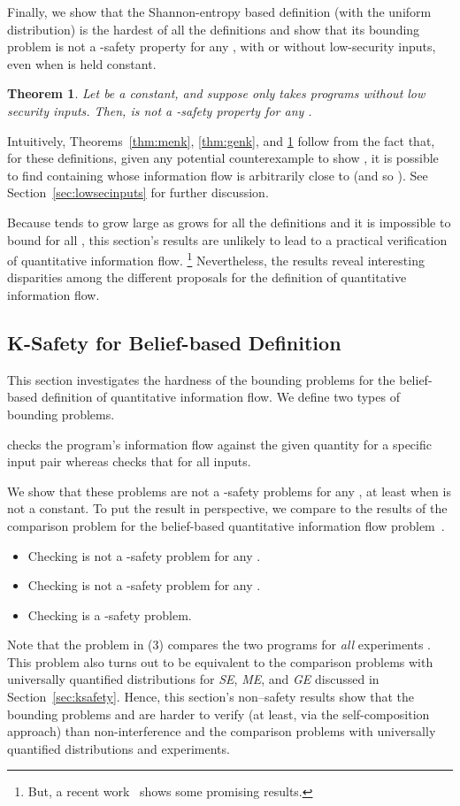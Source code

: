 \documentclass{llncs}
\newtheorem{theorem}{Theorem}[section]
\begin{document}
Finally, we show that the Shannon-entropy based definition (with the
uniform distribution) is the hardest of all the definitions and show
that its bounding problem is not a -safety property for any ,
with or without low-security inputs, even when  is held constant.
\begin{theorem}
\label{thm:senk}
Let  be a constant, and suppose  only takes programs
without low security inputs. Then,  is not a -safety
property for any .
\end{theorem}

Intuitively, Theorems~\ref{thm:menk}, \ref{thm:genk}, and
\ref{thm:senk} follow from the fact that, for these definitions, given
any potential counterexample  to show , it is possible to find  containing 
whose information flow is arbitrarily close to  (and so ).  See Section~\ref{sec:lowsecinputs} for further
discussion.

Because  tends to grow large as  grows for all the definitions
and it is impossible to bound  for all , this section's results
are unlikely to lead to a practical verification of quantitative
information flow.  \footnote{But, a recent
  work~\cite{DBLP:conf/acsac/Heusser2010} shows some promising
  results.}  Nevertheless, the results reveal interesting disparities
among the different proposals for the definition of quantitative
information flow.

\subsection{K-Safety for Belief-based Definition}

\label{sec:ksafetybelief}

This section investigates the hardness of the bounding problems for
the belief-based definition of quantitative information flow.  We
define two types of bounding problems.

 checks the program's information flow against the given
quantity for a specific input pair  whereas 
checks that for all inputs.

We show that these problems are not a -safety problems for any ,
at least when  is not a constant.  To put the result in
perspective, we compare to the results of the comparison problem for
the belief-based quantitative information flow
problem~\cite{yasuoka:toplas2010submit}.
\begin{itemize}
\item[(1)] Checking  is not a -safety problem for any .
\item[(2)] Checking  is not a -safety problem for any .
\item[(3)] Checking  is a -safety problem.
\end{itemize}
Note that the problem in (3) compares the two programs for {\em all}
experiments .  This problem also turns out to
be equivalent to the comparison problems with universally quantified
distributions for {\it SE}, {\it ME}, and {\it GE} discussed in
Section~\ref{sec:ksafety}.  Hence, this section's non--safety
results show that the bounding problems  and  are harder to verify (at least, via the self-composition
approach) than non-interference and the comparison problems with
universally quantified distributions and experiments.
\end{document}

